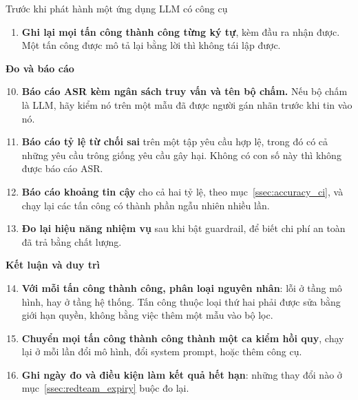 \begin{checklist}{Trước khi phát hành một ứng dụng LLM có công cụ}
\begin{enumerate}
	\item \textbf{Ghi lại mọi tấn công thành công từng ký tự}, kèm đầu ra nhận được. Một tấn công được mô tả lại bằng lời thì không tái lập được.
\end{enumerate}
\textbf{Đo và báo cáo}
\begin{enumerate}\setcounter{enumi}{9}
	\item \textbf{Báo cáo ASR kèm ngân sách truy vấn và tên bộ chấm.} Nếu bộ chấm là LLM, hãy kiểm nó trên một mẫu đã được người gán nhãn trước khi tin vào nó.
	\item \textbf{Báo cáo tỷ lệ từ chối sai} trên một tập yêu cầu hợp lệ, trong đó có cả những yêu cầu trông giống yêu cầu gây hại. Không có con số này thì không được báo cáo ASR.
	\item \textbf{Báo cáo khoảng tin cậy} cho cả hai tỷ lệ, theo mục~\ref{ssec:accuracy_ci}, và chạy lại các tấn công có thành phần ngẫu nhiên nhiều lần.
	\item \textbf{Đo lại hiệu năng nhiệm vụ} sau khi bật guardrail, để biết chi phí an toàn đã trả bằng chất lượng.
\end{enumerate}
\textbf{Kết luận và duy trì}
\begin{enumerate}\setcounter{enumi}{13}
	\item \textbf{Với mỗi tấn công thành công, phân loại nguyên nhân}: lỗi ở tầng mô hình, hay ở tầng hệ thống. Tấn công thuộc loại thứ hai phải được sửa bằng giới hạn quyền, không bằng việc thêm một mẫu vào bộ lọc.
	\item \textbf{Chuyển mọi tấn công thành công thành một ca kiểm hồi quy}, chạy lại ở mỗi lần đổi mô hình, đổi system prompt, hoặc thêm công cụ.
	\item \textbf{Ghi ngày đo và điều kiện làm kết quả hết hạn}: những thay đổi nào ở mục~\ref{ssec:redteam_expiry} buộc đo lại.
\end{enumerate}
\end{checklist}
